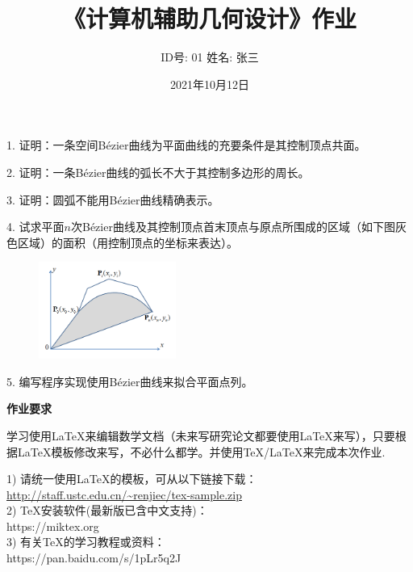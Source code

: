 ﻿\documentclass{article}
\newcommand{\Bezier}{B\'ezier}
\begin{document}
\title{《计算机辅助几何设计》作业}
\author{ID号: 01  \qquad  姓名: 张三}  %
\date{2021年10月12日}
\maketitle


1. 证明：一条空间\Bezier 曲线为平面曲线的充要条件是其控制顶点共面。

2. 证明：一条\Bezier 曲线的弧长不大于其控制多边形的周长。

3. 证明：圆弧不能用\Bezier 曲线精确表示。

4. 试求平面$n$次\Bezier 曲线及其控制顶点首末顶点与原点所围成的区域（如下图灰色区域）的面积（用控制顶点的坐标来表达）。
\begin{figure}[H]
  \centering
  \includegraphics[width=0.4\textwidth]{fig-1}\\
  \label{fig:fig-1}
\end{figure}

5. 编写程序实现使用\Bezier 曲线来拟合平面点列。


{\color{blue} \bf{作业要求}}

学习使用LaTeX来编辑数学文档（未来写研究论文都要使用LaTeX来写），只要根据LaTeX模板修改来写，不必什么都学。并使用TeX/LaTeX来完成本次作业.

1) 请统一使用LaTeX的模板，可从以下链接下载：\\
\url{http://staff.ustc.edu.cn/~renjiec/tex-sample.zip} \\
2) TeX安装软件(最新版已含中文支持)：\\
https://miktex.org \\
3) 有关TeX的学习教程或资料：\\
https://pan.baidu.com/s/1pLr5q2J
\end{document}
